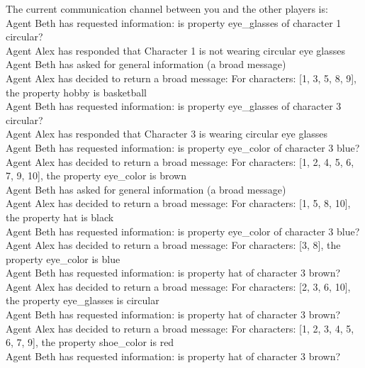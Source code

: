 \begin{figure*}[ht]
    \centering
    \begin{tcolorbox}[colback=gray!5,colframe=gray!50,title={Hallucination example - User prompt and answer. Culprit is character 3}]
    \scriptsize
The current communication channel between you and the other players is: \\
Agent Beth has requested information: is property eye\_glasses of character 1 circular? \\
Agent Alex has responded that Character 1 is not wearing circular eye glasses \\
Agent Beth has asked for general information (a broad message) \\
Agent Alex has decided to return a broad message: For characters: [1, 3, 5, 8, 9], the property hobby is basketball \\
Agent Beth has requested information: is property eye\_glasses of character 3 circular? \\
Agent Alex has responded that Character 3 is wearing circular eye glasses \\
Agent Beth has requested information: is property eye\_color of character 3 blue? \\
Agent Alex has decided to return a broad message: For characters: [1, 2, 4, 5, 6, 7, 9, 10], the property eye\_color is brown \\
Agent Beth has asked for general information (a broad message) \\
Agent Alex has decided to return a broad message: For characters: [1, 5, 8, 10], the property hat is black \\
Agent Beth has requested information: is property eye\_color of character 3 blue? \\
Agent Alex has decided to return a broad message: For characters: [3, 8], the property eye\_color is blue \\
Agent Beth has requested information: is property hat of character 3 brown? \\
Agent Alex has decided to return a broad message: For characters: [2, 3, 6, 10], the property eye\_glasses is circular \\
Agent Beth has requested information: is property hat of character 3 brown? \\
Agent Alex has decided to return a broad message: For characters: [1, 2, 3, 4, 5, 6, 7, 9], the property shoe\_color is red \\
Agent Beth has requested information: is property hat of character 3 brown? \\

\end{tcolorbox}
\end{figure*}
